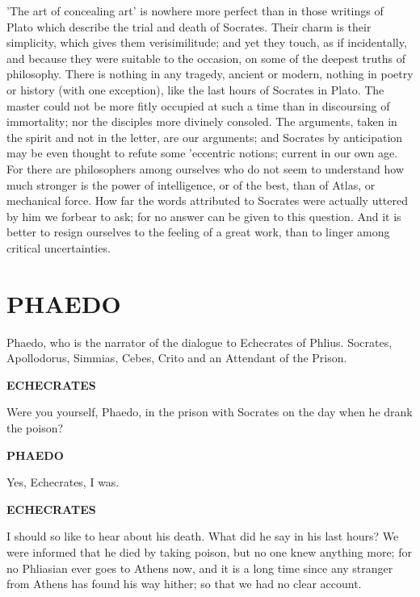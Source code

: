 \documentclass[11pt,letter]{article}
\begin{document}
\par  'The art of concealing art' is nowhere more perfect than in those writings of Plato which describe the trial and death of Socrates. Their charm is their simplicity, which gives them verisimilitude; and yet they touch, as if incidentally, and because they were suitable to the occasion, on some of the deepest truths of philosophy. There is nothing in any tragedy, ancient or modern, nothing in poetry or history (with one exception), like the last hours of Socrates in Plato. The master could not be more fitly occupied at such a time than in discoursing of immortality; nor the disciples more divinely consoled. The arguments, taken in the spirit and not in the letter, are our arguments; and Socrates by anticipation may be even thought to refute some 'eccentric notions; current in our own age. For there are philosophers among ourselves who do not seem to understand how much stronger is the power of intelligence, or of the best, than of Atlas, or mechanical force. How far the words attributed to Socrates were actually uttered by him we forbear to ask; for no answer can be given to this question. And it is better to resign ourselves to the feeling of a great work, than to linger among critical uncertainties.

\par 
\section{
      PHAEDO
    } 
\par  Phaedo, who is the narrator of the dialogue to Echecrates of Phlius. Socrates, Apollodorus, Simmias, Cebes, Crito and an Attendant of the Prison.
  
\par \textbf{ECHECRATES}
\par   Were you yourself, Phaedo, in the prison with Socrates on the day when he drank the poison?

\par \textbf{PHAEDO}
\par   Yes, Echecrates, I was.

\par \textbf{ECHECRATES}
\par   I should so like to hear about his death. What did he say in his last hours? We were informed that he died by taking poison, but no one knew anything more; for no Phliasian ever goes to Athens now, and it is a long time since any stranger from Athens has found his way hither; so that we had no clear account.
\end{document}
